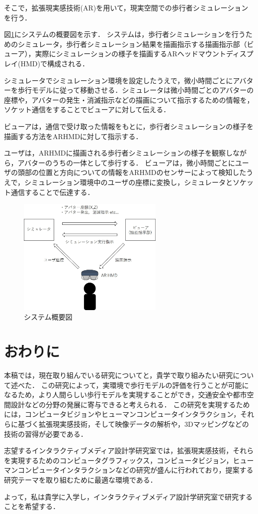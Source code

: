 \documentclass[twocolumn]{jarticle}%
\begin{document}
そこで，拡張現実感技術(AR)を用いて，現実空間での歩行者シミュレーションを行う．

図\ref{fig:systemImage}にシステムの概要図を示す．
システムは，歩行者シミュレーションを行うためのシミュレータ，歩行者シミュレーション結果を描画指示する描画指示部（ビューア），実際にシミュレーションの様子を描画するARヘッドマウントディスプレイ(HMD)で構成される．

シミュレータでシミュレーション環境を設定したうえで，微小時間ごとにアバターを歩行モデルに従って移動させる．シミュレータは微小時間ごとのアバターの座標や，アバターの発生・消滅指示などの描画について指示するための情報を，ソケット通信をすることでビューアに対して伝える．

ビューアは，通信で受け取った情報をもとに，歩行者シミュレーションの様子を描画する方法をARHMDに対して指示する．

ユーザは，ARHMDに描画される歩行者シミュレーションの様子を観察しながら，アバターのうちの一体として歩行する．
ビューアは，微小時間ごとにユーザの頭部の位置と方向についての情報をARHMDのセンサーによって検知したうえで，シミュレーション環境中のユーザの座標に変換し，シミュレータとソケット通信することで伝達する．

\begin{figure}[htbp]
  \begin{center}
    \includegraphics[width=70mm]{images/systemImage.jpg}
  \end{center}
    \caption{システム概要図}
    \label{fig:systemImage}
\end{figure}

\vspace{-2mm}
\section{おわりに}
\thispagestyle{fancy}

本稿では，現在取り組んでいる研究についてと，貴学で取り組みたい研究について述べた．
この研究によって，実環境で歩行モデルの評価を行うことが可能になるため，より人間らしい歩行モデルを実現することができ，交通安全や都市空間設計などの分野の発展に寄与できると考えられる．
この研究を実現するためには，コンピュータビジョンやヒューマンコンピュータインタラクション，それらに基づく拡張現実感技術，そして映像データの解析や，3Dマッピングなどの技術の習得が必要である．

志望するインタラクティブメディア設計学研究室では，拡張現実感技術，それらを実現するためのコンピュータグラフィックス，コンピュータビジョン，ヒューマンコンピュータインタラクションなどの研究が盛んに行われており，提案する研究テーマを取り組むために最適な環境である．

よって，私は貴学に入学し，インタラクティブメディア設計学研究室で研究することを希望する．
\vspace{-2mm}

\thispagestyle{fancy}

%
%
\end{document}
